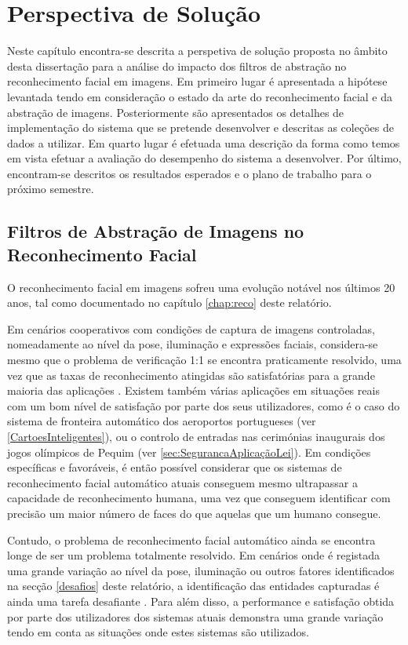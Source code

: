\chapter{Perspectiva de Solução} \label{chap:solução}

Neste capítulo encontra-se descrita a perspetiva de solução proposta no âmbito desta dissertação para a análise do impacto dos filtros de abstração no reconhecimento facial em imagens. Em primeiro lugar é apresentada a hipótese levantada tendo em consideração o estado da arte do reconhecimento facial e da abstração de imagens. Posteriormente são apresentados os detalhes de implementação do sistema que se pretende desenvolver e descritas as coleções de dados a utilizar. Em quarto lugar é efetuada uma descrição da forma como temos em vista efetuar a avaliação do desempenho do sistema a desenvolver. Por último, encontram-se descritos os resultados esperados e o plano de trabalho para o próximo semestre.

\section{Filtros de Abstração de Imagens no Reconhecimento Facial}
O reconhecimento facial em imagens sofreu uma evolução notável nos últimos 20 anos, tal como documentado no capítulo \ref{chap:reco} deste relatório. 

Em cenários cooperativos com condições de captura de imagens controladas, nomeadamente ao nível da pose, iluminação e expressões faciais, considera-se mesmo que o problema de verificação 1:1 se encontra praticamente resolvido, uma vez que as taxas de reconhecimento atingidas são satisfatórias para a grande maioria das aplicações \citep{Li2011}. Existem também várias aplicações em situações reais com um bom nível de satisfação por parte dos seus utilizadores, como é o caso do sistema de fronteira automático dos aeroportos portugueses (ver \ref{CartoesInteligentes}), ou o controlo de entradas nas cerimónias inaugurais dos jogos olímpicos de Pequim (ver \ref{sec:SegurancaAplicaçãoLei}). Em condições específicas e favoráveis, é então possível considerar que os sistemas de reconhecimento facial automático atuais conseguem mesmo ultrapassar a capacidade de reconhecimento humana, uma vez que conseguem identificar com precisão um maior número de faces do que aquelas que um humano consegue.

Contudo, o problema de reconhecimento facial automático ainda se encontra longe de ser um problema totalmente resolvido. Em cenários onde é registada uma grande variação ao nível da pose, iluminação ou outros fatores identificados na secção \ref{desafios} deste relatório, a identificação das entidades capturadas é ainda uma tarefa desafiante  \citep{Li2011}. Para além disso, a performance e satisfação obtida por parte dos utilizadores dos sistemas atuais demonstra uma grande variação tendo em conta as situações onde estes sistemas são utilizados. 

